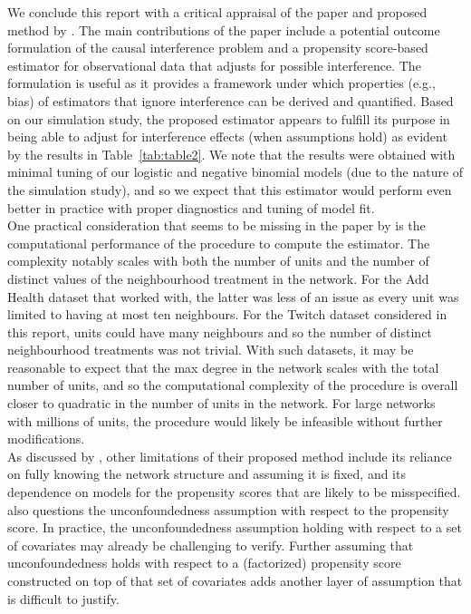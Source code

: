 \documentclass[10pt]{article}
\begin{document}
We conclude this report with a critical appraisal of the paper and proposed method by \textcite{Forastiere:2021}. The main contributions of the paper include a potential outcome formulation of the causal interference problem and a propensity score-based estimator for observational data that adjusts for possible interference. The formulation is useful as it provides a framework under which properties (e.g., bias) of estimators that ignore interference can be derived and quantified. Based on our simulation study, the proposed estimator appears to fulfill its purpose in being able to adjust for interference effects (when assumptions hold) as evident by the results in Table~\ref{tab:table2}. We note that the results were obtained with minimal tuning of our logistic and negative binomial models (due to the nature of the simulation study), and so we expect that this estimator would perform even better in practice with proper diagnostics and tuning of model fit.
\\

One practical consideration that seems to be missing in the paper by \textcite{Forastiere:2021} is the computational performance of the procedure to compute the estimator. The complexity notably scales with both the number of units and the number of distinct values of the neighbourhood treatment in the network. For the Add Health dataset that \citeauthor{Forastiere:2021} worked with, the latter was less of an issue as every unit was limited to having at most ten neighbours. For the Twitch dataset considered in this report, units could have many neighbours and so the number of distinct neighbourhood treatments was not trivial. With such datasets, it may be reasonable to expect that the max degree in the network scales with the total number of units, and so the computational complexity of the procedure is overall closer to quadratic in the number of units in the network. For large networks with millions of units, the procedure would likely be infeasible without further modifications.
\\

As discussed by \textcite{Forastiere:2021}, other limitations of their proposed method include its reliance on fully knowing the network structure and assuming it is fixed, and its dependence on models for the propensity scores that are likely to be misspecified. \textcite{Sanchez:2021} also questions the unconfoundedness assumption with respect to the propensity score. In practice, the unconfoundedness assumption holding with respect to a set of covariates may already be challenging to verify. Further assuming that unconfoundedness holds with respect to a (factorized) propensity score constructed on top of that set of covariates adds another layer of assumption that is difficult to justify.
\\
\end{document}
